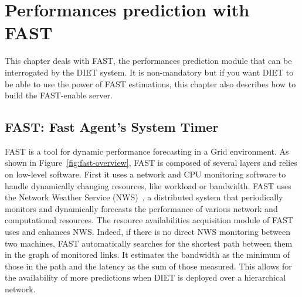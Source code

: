 
\chapter{Performances prediction with FAST}
\label{chapter:fast}


This chapter deals with FAST, the performances prediction module that
can be interrogated by the DIET system. It is non-mandatory but if you want
DIET to be able to use the power of FAST estimations, this chapter also
describes how to build the FAST-enable server.

\section{FAST: Fast Agent's System Timer}
\label{sec:FAST}

FAST \cite{Qui02} is a tool for dynamic performance forecasting in a
Grid environment. As shown in Figure~\ref{fig:fast-overview}, FAST is
composed of several layers and relies on low-level software. First it
uses a network and CPU monitoring software to handle dynamically
changing resources, like workload or bandwidth.  FAST uses the Network
Weather Service (NWS)~\cite{WSH99}, a distributed system that
periodically monitors and dynamically forecasts the performance of
various network and computational resources. The resource
availabilities acquisition module of FAST uses and enhances NWS.
Indeed, if there is no direct NWS monitoring between two machines,
FAST automatically searches for the shortest path between them in the
graph of monitored links. It estimates the bandwidth as the minimum of
those in the path and the latency as the sum of those measured. This
allows for the availability of more predictions when DIET is deployed
over a hierarchical network.

